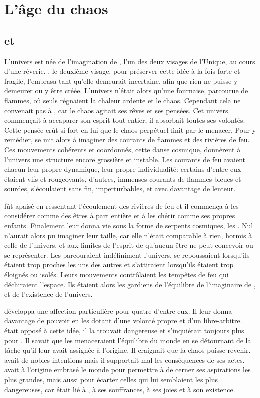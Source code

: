 \chapter{L'âge du chaos}


\section{\Mey et \Cind}

L'univers est née de l'imagination de \Mey, l'un des deux visages de l'Unique, au cours d'une rêverie. \Cind, le deuxième visage, pour préserver cette idée à la fois forte et fragile, l'embrasa tant qu'elle demeurait incertaine, afin que rien ne puisse y demeurer ou y être créée. L'univers n'était alors qu'une fournaise, parcourue de flammes, où seuls régnaient la chaleur ardente et le chaos. Cependant cela ne convenait pas à \Mey, car le chaos agitait ses rêves et ses pensées. Cet univers commençait à accaparer son esprit tout entier, il absorbait toutes ses volontés. Cette pensée crût si fort en lui que le chaos perpétuel finit par le menacer. Pour y remédier, \Cind se mit alors à imaginer des courants de flammes et des rivières de feu. Ces mouvements cohérents et coordonnés, cette danse cosmique, donnèrent à l'univers une structure encore grossière et instable. Les courants de feu avaient chacun leur propre dynamique, leur propre individualité: certains d'entre eux étaient vifs et rougeoyants, d'autres, immenses courants de flammes bleues et sourdes, s'écoulaient sans fin, imperturbables, et avec davantage de lenteur.

\Mey fût apaisé en ressentant l'écoulement des rivières de feu et il commença à les considérer comme des êtres à part entière et à les chérir comme ses propres enfants. Finalement \Mey leur donna vie sous la forme de serpents cosmiques, les \SerpentsCosmiques. Nul n'aurait alors pu imaginer leur taille, car elle n'était comparable à rien, hormis à celle de l'univers, et aux limites de l'esprit de \Mey qu'aucun être ne peut concevoir ou se représenter. Les \SerpentsCosmiques parcouraient indéfiniment l'univers, se repoussaient lorsqu'ils étaient trop proches les uns des autres et s'attiraient lorsqu'ils étaient trop éloignés ou isolés. Leurs mouvements contrôlaient les tempêtes de feu qui déchiraient l'espace. Ils étaient alors les gardiens de l'équilibre de l'imaginaire de \Mey, et de l'existence de l'univers.

\Mey développa une affection particulière pour quatre d'entre eux. Il leur donna davantage de pouvoir en les dotant d'une volonté propre et d'un libre-arbitre. \Cind était opposé à cette idée, il la trouvait dangereuse et s'inquiétait toujours plus pour \Mey. Il savait que les \Dormus menaceraient l'équilibre du monde en se détournant de la tâche qu'il leur avait assignée à l'origine. Il craignait que la chaos puisse revenir. \Mey avait de nobles intentions mais il supportait mal les conséquences de ses actes. \Cind avait à l'origine embrasé le monde pour permettre à \Mey de cerner ses aspirations les plus grandes, mais aussi pour écarter celles qui lui semblaient les plus dangereuses, car \Cind était lié à \Mey, à ses souffrances, à ses joies et à son existence.

